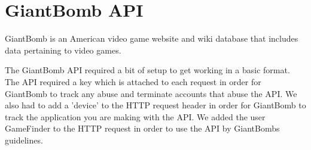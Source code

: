 \section{GiantBomb API}
GiantBomb is an American video game website and wiki database that includes data pertaining to video games.

The GiantBomb API required a bit of setup to get working in a basic format. The API required a key which is attached to each request in order for GiantBomb to track any abuse and terminate accounts that abuse the API. We also had to add a 'device' to the HTTP request header in order for GiantBomb to track the application you are making with the API. We added the user GameFinder to the HTTP request in order to use the API by GiantBombs guidelines.









